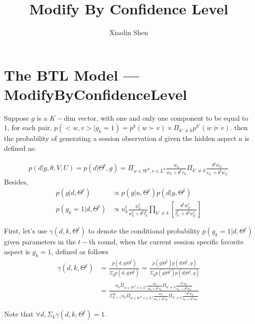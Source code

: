 \documentclass{article}
\title{Modify By Confidence Level}
\author{Xiaolin Shen}
\begin{document}
 

\maketitle


\section{The BTL Model ---ModifyByConfidenceLevel}
 
 Suppose $g$ is a $K-$dim vector, with one and only one component to be equal to $1$, for each pair, $p(<w,v>|g_k=1) = p^k(w\succ v) \times \Pi_{k'\neq k} p^{k'}(w \succeq v)$. then the probability of generating a session observation $d$ given the hidden aspect $a$ is defined as:

\begin{align}\label{equ:skyline}
		p(d|g,\theta,V,U) %
        =p(d|\Theta^t,g)=\Pi_{w \in W^d, v\in L^d} \frac{w_k}{w_k+\theta^t v_k}\Pi_{k'\neq k}\frac{\theta^t w_{k'}}{v_{k'}+\theta^t w_{k'}}
\end{align}
Besides,
\begin{eqnarray}
p(g|d,\Theta^{t}) & \propto   p(g|u,\Theta^{t}) p(d|g,\Theta^{t}) \\ \nonumber
 p(g_k=1|d,\Theta^{t}) & \propto  u_k^{t} \frac{w_{k}^t} {w_{k}^t+\theta^t l_{k}^t} \prod_{k'\neq k}  [\frac{\theta^t w_{k'}^t} {l_{k'}^t + \theta^t w_{k'}^t}]
\end{eqnarray}

First, let's use $\gamma(d,k,\Theta^t)$ to denote the conditional probability $p(g_k=1|d,\Theta^t)$ given parameters in the $t-$th round, when the current session specific favorite aspect is $g_k=1$, defined as follows
\begin{align}\label{equ:conditional}
\gamma(d,k,\Theta^t) &=\frac{p(d,g|\Theta^t)}{\Sigma_g p(d,g|\Theta^t)} = \frac{p(g|\Theta^t)p(d|\Theta^t,g)}{\Sigma_g p(g|\Theta^t)p(d|\Theta^t,g)}\\\nonumber
&=\frac{u_k \Pi_{w \in W^d, v\in L^d} \frac{w_k}{w_k+\theta^t v_k}\Pi_{k'\neq k}\frac{\theta^t w_{k'}}{v_{k'}+\theta^t w_{k'}}}{\Sigma_{k=1}^K u_k \Pi_{w \in W^d, v\in L^d} \frac{w_k}{w_k+\theta^t v_k}\Pi_{k'\neq k}\frac{\theta^t w_{k'}}{v_{k'}+\theta^t w_{k'}}}
\end{align}

Note that $\forall d, \Sigma_k \gamma(d,k,\Theta^t)=1$.
\end{document}
